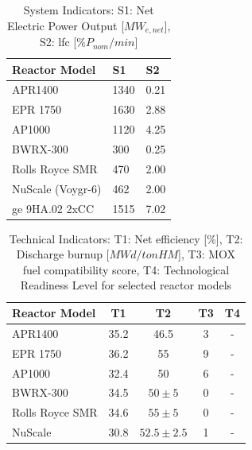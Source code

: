 \begin{table}[!ht]
    \centering
    \begin{tabularx}{0.6\textwidth}{l X X}
        \toprule
        \textbf{Reactor Model} & \textbf{S1} & \textbf{S2}\\
        \midrule
        APR1400           & 1340 & 0.21 \\
        EPR 1750          & 1630 & 2.88 \\
        AP1000            & 1120 & 4.25 \\
        BWRX-300          & 300 & 0.25 \\
        Rolls Royce SMR   & 470 & 2.00 \\
        NuScale (Voygr-6) & 462  & 2.00 \\
        \gls{ge} 9HA.02 2xCC    & 1515 & 7.02 \\
        \bottomrule
    \end{tabularx}
    \caption{System Indicators: S1: Net Electric Power Output [$MW_{e,net}$], S2: \gls{lfc} [$\%P_{nom}/min$]}
    \label{tab:indicators-system}
\end{table}

\begin{table}[!ht]
    \centering
    \begin{tabularx}{\textwidth}{X c c c c}
        \toprule
        \textbf{Reactor Model} & \textbf{T1} & \textbf{T2} & \textbf{T3} & \textbf{T4}\\
        \midrule
        APR1400         & 35.2 & 46.5 & 3 & - \\
        EPR 1750        & 36.2 & 55 & 9 & -\\
        AP1000          & 32.4 & 50 & 6 & - \\
        BWRX-300        & 34.5 & $50 \pm 5$ & 0 & - \\
        Rolls Royce SMR & 34.6 & $55 \pm 5$ & 0 & - \\
        NuScale         & 30.8 & $52.5 \pm 2.5$ & 1 & - \\
        \bottomrule
    \end{tabularx}
    \caption{Technical Indicators: T1: Net efficiency [\%], T2: Discharge burnup [$MWd/tonHM$], T3: MOX fuel compatibility score, T4: Technological Readiness Level for selected reactor models}
    \label{tab:indicators-technical}
\end{table}


